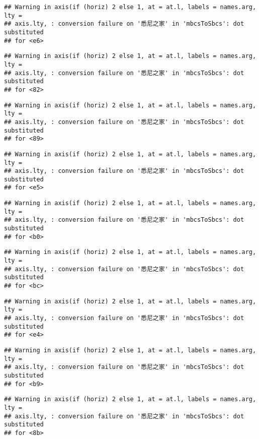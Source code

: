 \documentclass[
]{article}
\begin{document}
\begin{verbatim}
## Warning in axis(if (horiz) 2 else 1, at = at.l, labels = names.arg, lty =
## axis.lty, : conversion failure on '悉尼之家' in 'mbcsToSbcs': dot substituted
## for <e6>
\end{verbatim}

\begin{verbatim}
## Warning in axis(if (horiz) 2 else 1, at = at.l, labels = names.arg, lty =
## axis.lty, : conversion failure on '悉尼之家' in 'mbcsToSbcs': dot substituted
## for <82>
\end{verbatim}

\begin{verbatim}
## Warning in axis(if (horiz) 2 else 1, at = at.l, labels = names.arg, lty =
## axis.lty, : conversion failure on '悉尼之家' in 'mbcsToSbcs': dot substituted
## for <89>
\end{verbatim}

\begin{verbatim}
## Warning in axis(if (horiz) 2 else 1, at = at.l, labels = names.arg, lty =
## axis.lty, : conversion failure on '悉尼之家' in 'mbcsToSbcs': dot substituted
## for <e5>
\end{verbatim}

\begin{verbatim}
## Warning in axis(if (horiz) 2 else 1, at = at.l, labels = names.arg, lty =
## axis.lty, : conversion failure on '悉尼之家' in 'mbcsToSbcs': dot substituted
## for <b0>
\end{verbatim}

\begin{verbatim}
## Warning in axis(if (horiz) 2 else 1, at = at.l, labels = names.arg, lty =
## axis.lty, : conversion failure on '悉尼之家' in 'mbcsToSbcs': dot substituted
## for <bc>
\end{verbatim}

\begin{verbatim}
## Warning in axis(if (horiz) 2 else 1, at = at.l, labels = names.arg, lty =
## axis.lty, : conversion failure on '悉尼之家' in 'mbcsToSbcs': dot substituted
## for <e4>
\end{verbatim}

\begin{verbatim}
## Warning in axis(if (horiz) 2 else 1, at = at.l, labels = names.arg, lty =
## axis.lty, : conversion failure on '悉尼之家' in 'mbcsToSbcs': dot substituted
## for <b9>
\end{verbatim}

\begin{verbatim}
## Warning in axis(if (horiz) 2 else 1, at = at.l, labels = names.arg, lty =
## axis.lty, : conversion failure on '悉尼之家' in 'mbcsToSbcs': dot substituted
## for <8b>
\end{verbatim}
\end{document}
